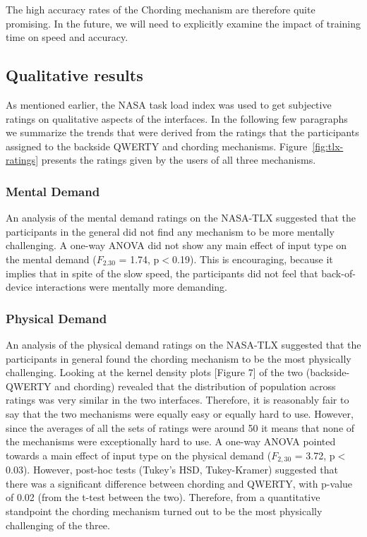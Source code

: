 The high accuracy rates of the Chording mechanism are therefore quite
promising.  In the future, we will need to explicitly examine the
impact of training time on speed and accuracy.

\subsection{Qualitative results}

As mentioned earlier, the NASA task load index was used to get subjective ratings on qualitative aspects of the interfaces. In the following few paragraphs we summarize the trends that were derived from the ratings that the participants assigned to the backside QWERTY and chording mechanisms. Figure~\ref{fig:tlx-ratings} presents the ratings given by the users of all three mechanisms.

\subsubsection{Mental Demand}

An analysis of the mental demand ratings on the NASA-TLX suggested that the participants in the general did not find any mechanism to be more mentally challenging. A one-way ANOVA did not show any main effect of input type on the mental demand ($F_{2.30}$ = 1.74, p$<$0.19). This is encouraging, because it implies that in spite of the slow speed, the participants did not feel that back-of-device interactions were mentally more demanding.

\subsubsection{Physical Demand}

An analysis of the physical demand ratings on the NASA-TLX suggested that the participants in general found the chording mechanism to be the most physically challenging. Looking at the kernel density plots [Figure 7] of the two (backside-QWERTY and chording) revealed that the distribution of population across ratings was very similar in the two interfaces. Therefore, it is reasonably fair to say that the two mechanisms were equally easy or equally hard to use. However, since the averages of all the sets of ratings were around 50 it means that none of the mechanisms were exceptionally hard to use. A one-way ANOVA pointed towards a main effect of input type on the physical demand ($F_{2,30}$ = 3.72, p$<$0.03). However, post-hoc tests (Tukey's HSD, Tukey-Kramer) suggested that there was a significant difference between chording and QWERTY, with p-value of 0.02 (from the t-test between the two). Therefore, from a quantitative standpoint the chording mechanism turned out to be the most physically challenging of the three.

